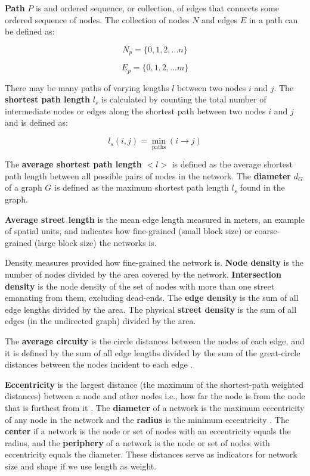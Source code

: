 \textbf{Path} $P$ is and ordered sequence, or collection, of edges that connects some ordered sequence of nodes. The collection of nodes $N$ and edges $E$ in a path can be defined as:

\begin{equation} \label{eq:3}
N_p = \{0,1,2,...n\}
\end{equation}

\begin{equation} \label{eq:4}
E_p = \{0,1,2,...m\}
\end{equation}

There may be many paths of varying lengths $l$ between two nodes $i$ and $j$. The \textbf{shortest path length} $l_s$ is calculated by counting the total number of intermediate nodes or edges along the shortest path between two nodes $i$ and $j$ and is defined as:

\begin{equation} \label{eq:5}
	l_s(i,j) = \min_\text{paths}({i \to j})
\end{equation}

The \textbf{average shortest path length} $<l>$ is defined as the average shortest path length between all possible pairs of nodes in the network. The \textbf{diameter} $d_G$ of a graph $G$ is defined as the maximum shortest path length $l_s$ found in the graph.

\textbf{Average street length} is the mean edge length measured in meters, an example of spatial units, and indicates how fine-grained (small block size) or coarse-grained (large block size) the networks is.

Density measures provided how fine-grained the network is. \textbf{Node density} is the number of nodes divided by the area covered by the network. \textbf{Intersection density} is the node density of the set of nodes with more than one street emanating from them, excluding dead-ends. The \textbf{edge density} is the sum of all edge lengths divided by the area. The physical \textbf{street density} is the sum of all edges (in the undirected graph) divided by the area.

The \textbf{average circuity} is the circle distances between the nodes of each edge, and it is defined by the sum of all edge lengths divided by the sum of the great-circle distances between the nodes incident to each edge \cite{giacomin-levinson_2015}.

\textbf{Eccentricity} is the largest distance (the maximum of the shortest-path weighted distances) between a node and other nodes i.e., how far the node is from the node that is furthest from it \cite{urban-keitt_2001}. The \textbf{diameter} of a network is the maximum eccentricity of any node in the network and the \textbf{radius} is the minimum eccentricity \cite{hage-harary_1995}. The \textbf{center} if a network is the node or set of nodes with an eccentricity equals the radius, and the \textbf{periphery} of a network is the node or set of nodes with eccentricity equals the diameter. These distances serve as indicators for network size and shape if we use length as weight. 

